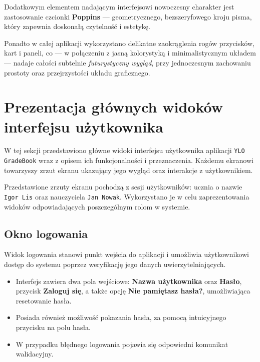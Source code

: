 Dodatkowym elementem nadającym interfejsowi nowoczesny charakter jest zastosowanie czcionki \textbf{Poppins} — geometrycznego, bezszeryfowego kroju pisma, który zapewnia doskonałą czytelność i estetykę. 

Ponadto w całej aplikacji wykorzystano delikatne zaokrąglenia rogów przycisków, kart i paneli, co — w połączeniu z jasną kolorystyką i minimalistycznym układem — nadaje całości subtelnie \textit{futurystyczny wygląd}, przy jednoczesnym zachowaniu prostoty oraz przejrzystości układu graficznego.

\section{Prezentacja głównych widoków interfejsu użytkownika}

W tej sekcji przedstawiono główne widoki interfejsu użytkownika aplikacji \texttt{YLO GradeBook} wraz z opisem ich funkcjonalności i przeznaczenia. Każdemu ekranowi towarzyszy zrzut ekranu ukazujący jego wygląd oraz interakcje z użytkownikiem.

Przedstawione zrzuty ekranu pochodzą z sesji użytkowników: ucznia o nazwie \texttt{Igor Lis} oraz nauczyciela \texttt{Jan Nowak}. Wykorzystano je w celu zaprezentowania widoków odpowiadających poszczególnym rolom w systemie.

\subsection{Okno logowania}
Widok logowania stanowi punkt wejścia do aplikacji i umożliwia użytkownikowi dostęp do systemu poprzez weryfikację jego danych uwierzytelniających.
\begin{itemize}
    \item Interfejs zawiera dwa pola wejściowe: \textbf{Nazwa użytkownika} oraz \textbf{Hasło}, przycisk \textbf{Zaloguj się}, a także opcję \textbf{Nie pamiętasz hasła?}, umożliwiająca resetowanie hasła.
    \item Posiada również możliwość pokazania hasła, za pomocą intuicyjnego przycisku na polu hasła.
    \item W przypadku błędnego logowania pojawia się odpowiedni komunikat walidacyjny.
\end{itemize}

